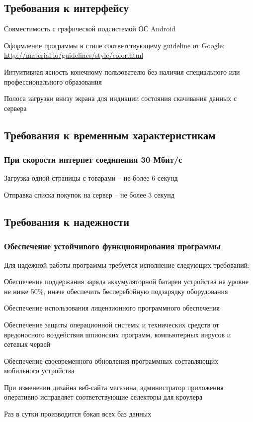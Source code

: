 \subsection{Требования к интерфейсу}
\begin{my_enumerate}
\item Совместимость с графической подсистемой ОС Android {\textregistered}
\item Оформление программы в стиле соответствующему guideline от Google: \url{http://material.io/guidelines/style/color.html}
\item Интуитивная ясность конечному пользователю без наличия специального или профессионального образования
\item Полоса загрузки внизу экрана для индикции состояния скачивания данных с сервера
\end{my_enumerate}


\subsection{Требования к временным характеристикам}

\subsubsection{При скорости интернет соединения 30 Мбит/с}
\begin{my_enumerate}
\item Загрузка одной страницы с товарами -- не более 6 секунд
\item Отправка списка покупок на сервер -- не более 3 секунд
\end{my_enumerate}


\subsection{Требования к надежности}
\subsubsection{Обеспечение устойчивого функционирования программы}

Для надежной работы программы требуется исполнение следующих требований:
\begin{my_enumerate}
\item Обеспечение поддержания заряда аккумуляторной батареи устройства на
уровне не ниже 50\%, иначе обеспечить бесперебойную подзарядку оборудования
\item Обеспечение использования лицензионного программного обеспечения
\item Обеспечение защиты операционной системы и технических средств от
вредоносного воздействия шпионских программ, компьютерных вирусов и сетевых
червей
\item Обеспечение своевременного обновления программных составляющих мобильного устройства
\item При изменении дизайна веб-сайта магазина, администратор приложения оперативно
исправляет соответствующие селекторы для кроулера
\item Раз в сутки производится бэкап всех баз данных
\end{my_enumerate}


